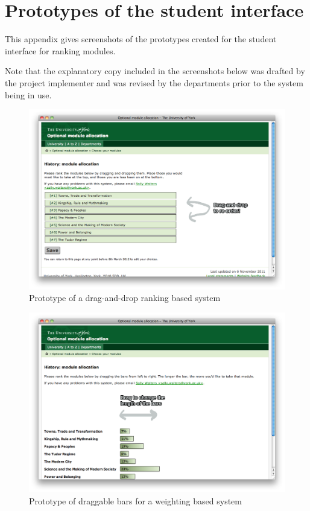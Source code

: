 \documentclass[draft]{scrartcl}
\begin{document}
\clearpage
\section{Prototypes of the student interface}
\label{sec:prototypes}

This appendix gives screenshots of the prototypes created for the student
interface for ranking modules.

Note that the explanatory copy included in the screenshots below was drafted
by the project implementer and was revised by the departments prior to the
system being in use.

\begin{figure}[h]
  \begin{center}
    \includegraphics[width=0.85\linewidth]{images/prototypes/student_prototype_1.png}
  \end{center}
  \caption{Prototype of a drag-and-drop ranking based system}
\end{figure}

\begin{figure}
  \begin{center}
    \includegraphics[width=0.85\linewidth]{images/prototypes/student_prototype_2.png}
  \end{center}
  \caption{Prototype of draggable bars for a weighting based system}
  \label{prototype_student_weighting}
\end{figure}
\end{document}
